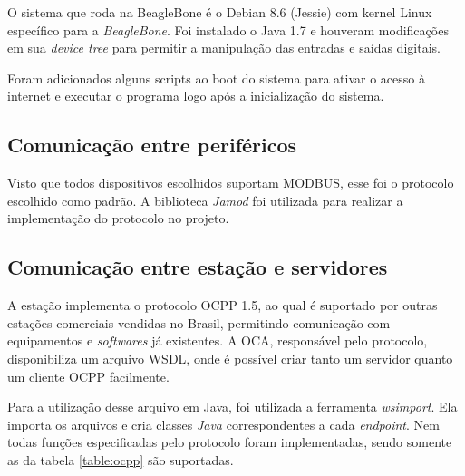       O sistema que roda na BeagleBone é o Debian 8.6 (Jessie) com kernel Linux específico para a \textit{BeagleBone}. Foi instalado o Java 1.7 e houveram modificações em sua \textit{device tree} para permitir a manipulação das entradas e saídas digitais.

      Foram adicionados alguns scripts ao boot do sistema para ativar o acesso à internet e executar o programa logo após a inicialização do sistema.

    \subsection{Comunicação entre periféricos}

      Visto que todos dispositivos escolhidos suportam MODBUS, esse foi o protocolo escolhido como padrão. A biblioteca \textit{Jamod} foi utilizada para realizar a implementação do protocolo no projeto.

    \subsection{Comunicação entre estação e servidores}

      A estação implementa o protocolo \ac{OCPP} 1.5, ao qual é suportado por outras estações comerciais vendidas no Brasil, permitindo comunicação com equipamentos e \textit{softwares} já existentes. A \ac{OCA}, responsável pelo protocolo, disponibiliza um arquivo WSDL, onde é possível criar tanto um servidor quanto um cliente OCPP facilmente.

      Para a utilização desse arquivo em Java, foi utilizada a ferramenta \textit{wsimport}. Ela importa os arquivos e cria classes \textit{Java} correspondentes a cada \textit{endpoint}. Nem todas funções especificadas pelo protocolo foram implementadas, sendo somente as da tabela \ref{table:ocpp} são suportadas.

